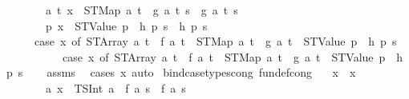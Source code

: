 \begin{isabellebody}
\ \ \ \ \ \ \ {\isachardoublequoteopen}{\isasymAnd}a\ t{\isachardot}{\kern0pt}\ x\ {\isacharequal}{\kern0pt}\ {\isacharparenleft}{\kern0pt}STMap\ a\ t{\isacharparenright}{\kern0pt}\ {\isasymLongrightarrow}\ g\ a\ t\ s\ {\isacharequal}{\kern0pt}\ g{\isacharprime}{\kern0pt}\ a\ t\ s{\isachardoublequoteclose}\isanewline
\ \ \ \ \ \ \ {\isachardoublequoteopen}{\isasymAnd}p{\isachardot}{\kern0pt}\ x\ {\isacharequal}{\kern0pt}\ {\isacharparenleft}{\kern0pt}STValue\ p{\isacharparenright}{\kern0pt}\ {\isasymLongrightarrow}\ h\ p\ s\ {\isacharequal}{\kern0pt}\ h{\isacharprime}{\kern0pt}\ p\ s{\isachardoublequoteclose}\isanewline
\ \ \ \ \ {\isachardoublequoteopen}{\isacharparenleft}{\kern0pt}case\ x\ of\ {\isacharparenleft}{\kern0pt}STArray\ a\ t{\isacharparenright}{\kern0pt}\ {\isasymRightarrow}\ f\ a\ t\ {\isacharbar}{\kern0pt}\ {\isacharparenleft}{\kern0pt}STMap\ a\ t{\isacharparenright}{\kern0pt}\ {\isasymRightarrow}\ g\ a\ t\ {\isacharbar}{\kern0pt}\ {\isacharparenleft}{\kern0pt}STValue\ p{\isacharparenright}{\kern0pt}\ {\isasymRightarrow}\ h\ p{\isacharparenright}{\kern0pt}\ s\isanewline
\ \ \ \ \ \ \ \ \ {\isacharequal}{\kern0pt}\ {\isacharparenleft}{\kern0pt}case\ x{\isacharprime}{\kern0pt}\ of\ {\isacharparenleft}{\kern0pt}STArray\ a\ t{\isacharparenright}{\kern0pt}\ {\isasymRightarrow}\ f{\isacharprime}{\kern0pt}\ a\ t\ {\isacharbar}{\kern0pt}\ {\isacharparenleft}{\kern0pt}STMap\ a\ t{\isacharparenright}{\kern0pt}\ {\isasymRightarrow}\ g{\isacharprime}{\kern0pt}\ a\ t\ {\isacharbar}{\kern0pt}\ {\isacharparenleft}{\kern0pt}STValue\ p{\isacharparenright}{\kern0pt}\ {\isasymRightarrow}\ h{\isacharprime}{\kern0pt}\ p{\isacharparenright}{\kern0pt}\ s{\isachardoublequoteclose}\isanewline
%
\isadelimproof
\ \ %
\endisadelimproof
%
\isatagproof
{}\isamarkupfalse%
\ assms\ \isamarkupfalse%
\ {\isacharparenleft}{\kern0pt}cases\ x{\isacharcomma}{\kern0pt}\ auto{\isacharparenright}{\kern0pt}%
\endisatagproof
{\isafoldproof}%
%
\isadelimproof
\isanewline
%
\endisadelimproof
\isanewline
{}\isamarkupfalse%
\ bind{\isacharunderscore}{\kern0pt}case{\isacharunderscore}{\kern0pt}types{\isacharunderscore}{\kern0pt}cong\ {\isacharbrackleft}{\kern0pt}fundef{\isacharunderscore}{\kern0pt}cong{\isacharbrackright}{\kern0pt}{\isacharcolon}{\kern0pt}\isanewline
\ \ \ {\isachardoublequoteopen}x\ {\isacharequal}{\kern0pt}\ x{\isacharprime}{\kern0pt}{\isachardoublequoteclose}\isanewline
\ \ \ \ \ \ \ {\isachardoublequoteopen}{\isasymAnd}a{\isachardot}{\kern0pt}\ x\ {\isacharequal}{\kern0pt}\ {\isacharparenleft}{\kern0pt}TSInt\ a{\isacharparenright}{\kern0pt}\ {\isasymLongrightarrow}\ f\ a\ s\ {\isacharequal}{\kern0pt}\ f{\isacharprime}{\kern0pt}\ a\ s{\isachardoublequoteclose}\isanewline

\end{isabellebody}
